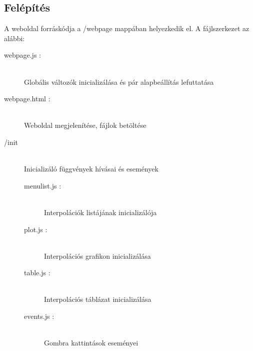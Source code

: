 \subsection{Felépítés}
	A weboldal forráskódja a /webpage mappában helyezkedik el. 
	A fájlszerkezet az alábbi:
	\begin{description}
		\item[webpage.js :] \hfill \\  
		Globális változók inicializálása és pár alapbeállítás lefuttatása
		
		\item[webpage.html :]  \hfill \\ 
		Weboldal megjelenítése, fájlok betöltése
		
		\item[/init] \hfill \\ 
		Inicializáló függvények hívásai és események
		\begin{description}
			\item[menulist.js : ] \hfill \\ 
				Interpolációk listájának inicializálója
		  	\item[plot.js : ] \hfill \\ 
		  		Interpolációs grafikon inicializálása
			\item[table.js : ] \hfill \\ 
				Interpolációs táblázat inicializálása
		 	\item[events.js : ] \hfill \\ 
		 		Gombra kattintások eseményei
		\end{description}


\end{description}
